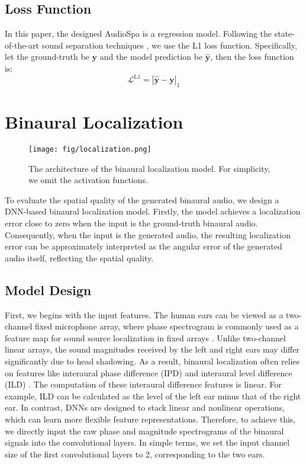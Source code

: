 \documentclass{IEEEtran}
\begin{document}
\subsection{Loss Function} \label{subsec:loss}
In this paper, the designed AudioSpa is a regression model. Following the state-of-the-art sound separation techniques \cite{luo2023music, wang2023tf}, we use the L1 loss function. Specifically, let the ground-truth be $\mathbf{y}$ and the model prediction be $\hat{\mathbf{y}}$, then the loss function is:
\begin{equation}\label{eq:loss}
    \mathcal{L}^{\mathrm{L1}} = |\hat{\mathbf{y}} - \mathbf{y}|_{1}
\end{equation}


\section{Binaural Localization}   \label{sec:local}
\begin{figure*}[t]
    \centering
    \texttt{[image: fig/localization.png]}
    \caption{The architecture of the binaural localization model. For simplicity, we omit the activation functions.}
    \label{fig:local}
\end{figure*}


To evaluate the spatial quality of the generated binaural audio, we design a DNN-based binaural localization model. Firstly, the model achieves a localization error close to zero when the input is the ground-truth binaural audio. Consequently, when the input is the generated audio, the resulting localization error can be approximately interpreted as the angular error of the generated audio itself, reflecting the spatial quality.

\subsection{Model Design}
First, we begins with the input features. The human ears can be viewed as a two-channel fixed microphone array, where phase spectrogram is commonly used as a feature map for sound source localization in fixed arrays \cite{feng2025eliminating}. Unlike two-channel linear arrays, the sound magnitudes received by the left and right ears may differ significantly due to head shadowing. As a result, binaural localization often relies on features like interaural phase difference (IPD) and interaural level difference (ILD) \cite{grumiaux2022survey}.  The computation of these interaural difference features is linear. For example, ILD can be calculated as the level of the left ear minus that of the right ear. In contrast, DNNs are designed to stack linear and nonlinear operations, which can learn more flexible feature representations. Therefore, to achieve this, we directly input the raw phase and magnitude spectrograms of the binaural signals into the convolutional layers. In simple terms, we set the input channel size of the first convolutional layers to 2, corresponding to the two ears.
\end{document}
